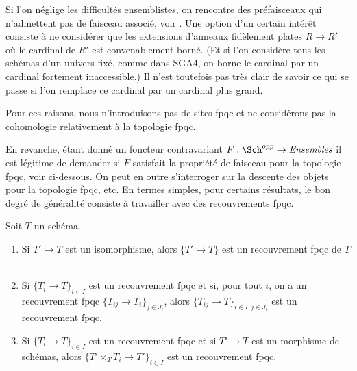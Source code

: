 \medskip\noindent
Si l'on néglige les difficultés ensemblistes, on rencontre des préfaisceaux
qui n'admettent pas de faisceau associé, voir
\cite[théorème 5.5]{Waterhouse-fpqc-sheafification}.
Une option d'un certain intérêt consiste à ne considérer que les extensions d'anneaux
fidèlement plates $R \to R'$ où le cardinal de $R'$ est convenablement borné.
(Et si l'on considère tous les schémas d'un univers fixé, comme dans SGA4, on
borne le cardinal par un cardinal fortement inaccessible.)
Il n'est toutefois pas très clair de savoir ce qui se passe si l'on remplace ce cardinal
par un cardinal plus grand.

\medskip\noindent
Pour ces raisons, nous n'introduisons pas de sites fpqc et ne considérons pas
la cohomologie relativement à la topologie fpqc.

\medskip\noindent
En revanche, étant donné un foncteur contravariant
$F : \Sch^{opp} \to \textit{Ensembles}$
il est légitime de demander si $F$ satisfait la propriété de faisceau
pour la topologie fpqc, voir ci-dessous.
On peut en outre s'interroger sur la descente des objets
pour la topologie fpqc, etc. En termes simples, pour certains résultats, le bon
degré de généralité consiste à travailler avec des recouvrements fpqc.

\begin{lemma}
\label{lemma-fpqc}
Soit $T$ un schéma.
\begin{enumerate}
\item Si $T' \to T$ est un isomorphisme, alors $\{T' \to T\}$
est un recouvrement fpqc de $T$.
\item Si $\{T_i \to T\}_{i\in I}$ est un recouvrement fpqc et si, pour tout
$i$, on a un recouvrement fpqc $\{T_{ij} \to T_i\}_{j\in J_i}$, alors
$\{T_{ij} \to T\}_{i \in I, j\in J_i}$ est un recouvrement fpqc.
\item Si $\{T_i \to T\}_{i\in I}$ est un recouvrement fpqc
et si $T' \to T$ est un morphisme de schémas, alors
$\{T' \times_T T_i \to T'\}_{i\in I}$ est un recouvrement fpqc.
\end{enumerate}
\end{lemma}


